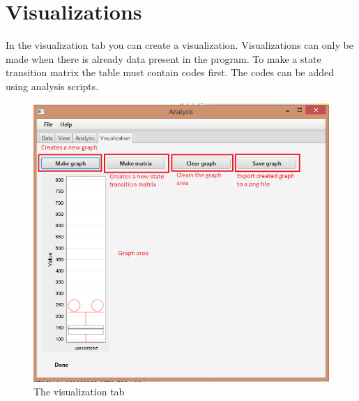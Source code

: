 \documentclass[a4paper]{article}
\begin{document}
\section{Visualizations}
In the visualization tab you can create a visualization. Visualizations can only be made when there is already data present in the program. To make a state transition matrix the table must contain codes first. The codes can be added using analysis scripts.
\begin{figure}[h]
	\centering
	\includegraphics[scale=0.5]{visualizationtab.png}
 	\caption{The visualization tab}
	\label{fig:visualizationtab}
\end{figure}
\end{document}
